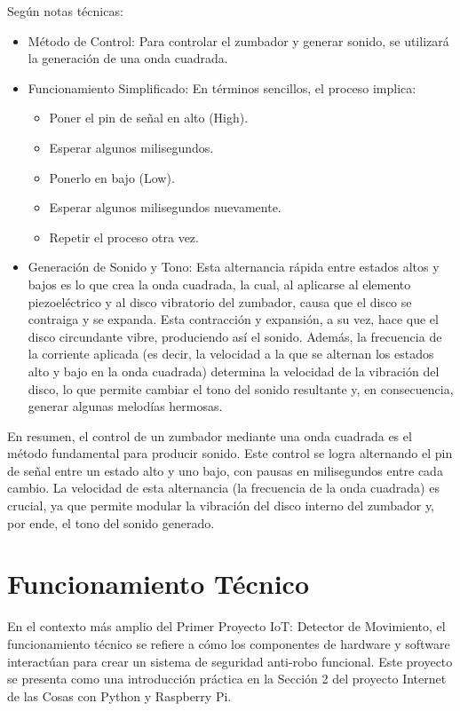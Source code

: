 \documentclass{report}
\begin{document}
Según notas técnicas:
\begin{itemize}
    \item Método de Control: Para controlar el zumbador y generar sonido, se utilizará la generación de una onda cuadrada.
    \item Funcionamiento Simplificado: En términos sencillos, el proceso implica:
    \begin{itemize}
        \item Poner el pin de señal en alto (High).
        \item Esperar algunos milisegundos.
        \item Ponerlo en bajo (Low).
        \item Esperar algunos milisegundos nuevamente.
        \item Repetir el proceso otra vez.
    \end{itemize}
    \item Generación de Sonido y Tono: Esta alternancia rápida entre estados altos y bajos es lo que crea la onda cuadrada, la cual, al aplicarse 
    al elemento piezoeléctrico y al disco vibratorio del zumbador, causa que el disco se contraiga y se expanda. Esta contracción y expansión, a su 
    vez, hace que el disco circundante vibre, produciendo así el sonido. Además, la frecuencia de la corriente aplicada (es decir, la velocidad a 
    la que se alternan los estados alto y bajo en la onda cuadrada) determina la velocidad de la vibración del disco, lo que permite cambiar el 
    tono del sonido resultante y, en consecuencia, generar algunas melodías hermosas.
\end{itemize}
En resumen, el control de un zumbador mediante una onda cuadrada es el método fundamental para producir sonido. Este control se logra alternando 
el pin de señal entre un estado alto y uno bajo, con pausas en milisegundos entre cada cambio. La velocidad de esta alternancia (la frecuencia de 
la onda cuadrada) es crucial, ya que permite modular la vibración del disco interno del zumbador y, por ende, el tono del sonido generado.

\section{Funcionamiento Técnico}
En el contexto más amplio del Primer Proyecto IoT: Detector de Movimiento, el funcionamiento técnico se refiere a cómo los componentes de hardware y 
software interactúan para crear un sistema de seguridad anti-robo funcional. Este proyecto se presenta como una introducción práctica en la Sección 2 
del proyecto Internet de las Cosas con Python y Raspberry Pi.
\end{document}
